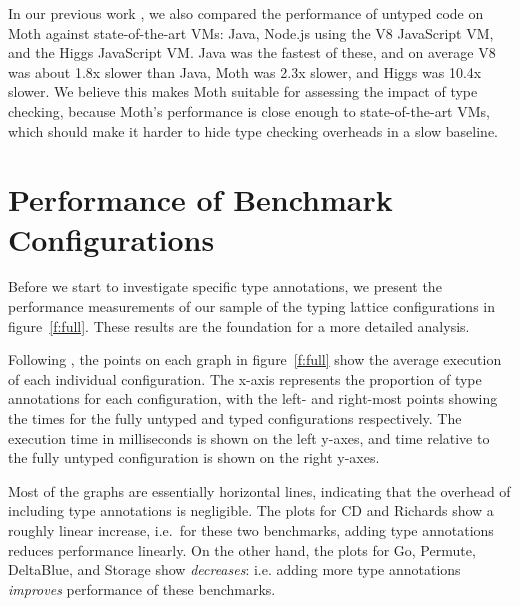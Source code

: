\documentclass[sigplan,screen]{acmart}
\begin{document}
In our previous work \cite{roberts-and-co-ecoop-2019}, we also compared the performance of untyped code on Moth against state-of-the-art VMs: Java, Node.js using the V8 JavaScript VM, and the Higgs JavaScript VM. Java was the fastest of these, and on average V8 was about 1.8x slower than Java, Moth was 2.3x slower, and Higgs was 10.4x slower.
We believe this makes Moth suitable for assessing the impact of type checking,
because Moth's performance is close enough to state-of-the-art VMs,
which should make it harder to hide type checking overheads in a slow baseline.

\section{Performance of Benchmark Configurations}
\label{s-overall}

\begin{figure*}
	
	\caption{Graphs of (at most) 102 configurations in the typing lattices for each benchmark. Time is measured as the mean of the 351\textsuperscript{st} to the 1,000\textsuperscript{th} benchmark iteration under a single invocation of Moth (lower is better).}
	\label{f:full}
\end{figure*}

Before we start to investigate specific type annotations,
we present the performance measurements of our sample of the typing lattice configurations in figure~\ref{f:full}.
These results are the foundation for a more detailed analysis.

Following \cite{vitousek-transient-arXive-2019}, the points on each graph in figure~\ref{f:full} show the average execution of each individual configuration. The x-axis represents the proportion of type annotations for each configuration, with the left- and right-most points showing the times for the fully untyped and typed configurations respectively. The execution time in milliseconds is shown on the left y-axes, and time relative to the fully untyped configuration is shown on the right y-axes.

Most of the graphs are essentially horizontal lines, indicating that the overhead of including type annotations is negligible. The plots for CD and Richards show a roughly linear increase, i.e.\ for these two benchmarks, adding type annotations reduces performance linearly. On the other hand, the plots for Go, Permute, DeltaBlue, and Storage show \emph{decreases}: i.e. adding more type annotations \emph{improves} performance of these benchmarks.
\end{document}
